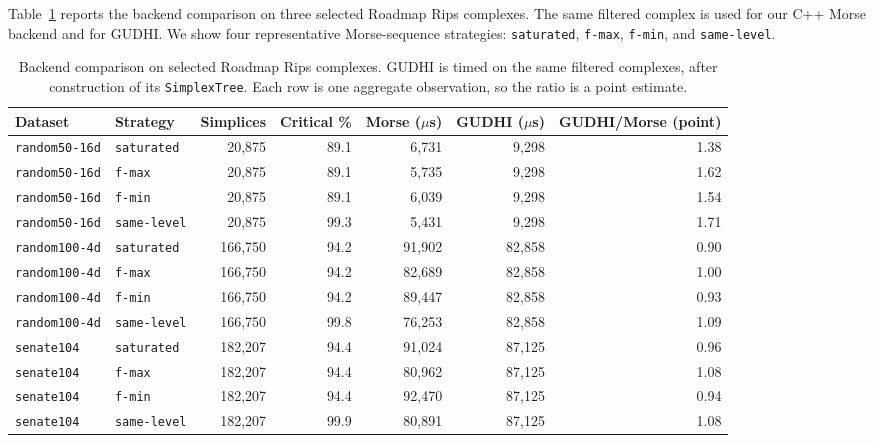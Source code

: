 Table~\ref{tab:paper-roadmap-selected} reports the backend comparison on three selected
Roadmap Rips complexes.  The same filtered complex is used for our C++ Morse backend and
for GUDHI.  We show four representative Morse-sequence strategies:
\texttt{saturated}, \texttt{f-max}, \texttt{f-min}, and \texttt{same-level}.

\begin{table}[t]
\centering
\scriptsize
\setlength{\tabcolsep}{2.5pt}
\begin{tabular}{llrrrrr}
\toprule
Dataset & Strategy & Simplices & Critical \% & Morse ($\mu$s) & GUDHI ($\mu$s) & GUDHI/Morse (point) \\
\midrule
\texttt{random50-16d} & \texttt{saturated} & 20,875 & 89.1 & 6,731 & 9,298 & 1.38 \\
\texttt{random50-16d} & \texttt{f-max} & 20,875 & 89.1 & 5,735 & 9,298 & 1.62 \\
\texttt{random50-16d} & \texttt{f-min} & 20,875 & 89.1 & 6,039 & 9,298 & 1.54 \\
\texttt{random50-16d} & \texttt{same-level} & 20,875 & 99.3 & 5,431 & 9,298 & 1.71 \\
\midrule
\texttt{random100-4d} & \texttt{saturated} & 166,750 & 94.2 & 91,902 & 82,858 & 0.90 \\
\texttt{random100-4d} & \texttt{f-max} & 166,750 & 94.2 & 82,689 & 82,858 & 1.00 \\
\texttt{random100-4d} & \texttt{f-min} & 166,750 & 94.2 & 89,447 & 82,858 & 0.93 \\
\texttt{random100-4d} & \texttt{same-level} & 166,750 & 99.8 & 76,253 & 82,858 & 1.09 \\
\midrule
\texttt{senate104} & \texttt{saturated} & 182,207 & 94.4 & 91,024 & 87,125 & 0.96 \\
\texttt{senate104} & \texttt{f-max} & 182,207 & 94.4 & 80,962 & 87,125 & 1.08 \\
\texttt{senate104} & \texttt{f-min} & 182,207 & 94.4 & 92,470 & 87,125 & 0.94 \\
\texttt{senate104} & \texttt{same-level} & 182,207 & 99.9 & 80,891 & 87,125 & 1.08 \\
\bottomrule
\end{tabular}
\caption{Backend comparison on selected Roadmap Rips complexes.  GUDHI is timed on the
same filtered complexes, after construction of its \texttt{SimplexTree}.  Each row is one
aggregate observation, so the ratio is a point estimate.}
\label{tab:paper-roadmap-selected}
\end{table}

